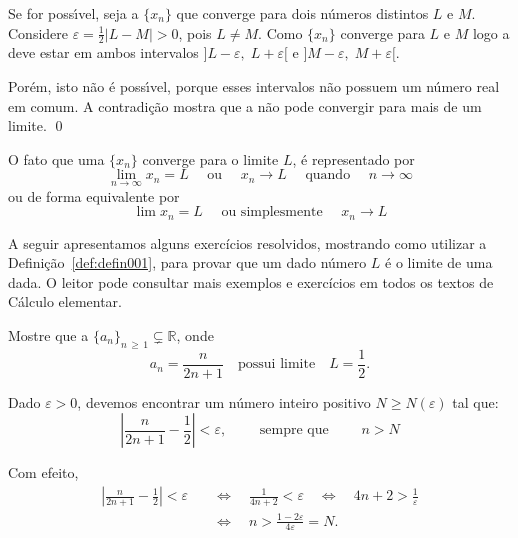 \prova Se for poss\'{\i}vel, seja a \seq $\{x_n\}$ que converge para dois n\'{u}meros distintos $L$ e $M$. Considere $\varepsilon=\frac{1}{2}|L-M|>0$, pois  $L\neq M$. Como $\{x_n\}$ converge para $L$ e $M$ logo a \seq deve estar em ambos intervalos $]L-\varepsilon,\; L+\varepsilon[$ e $]M-\varepsilon,\; M+\varepsilon[$.

Por\'{e}m, isto n\~{a}o \'{e} poss\'{\i}vel, porque esses intervalos n\~{a}o possuem um n\'{u}mero real em comum. A contradi\c{c}\~{a}o mostra que a \seq n\~{a}o pode convergir para mais de um limite. \qed

O fato que uma \seq $\{x_n\}$ converge para o limite $L$, \'{e} representado por
\begin{equation*}
    \lim_{n\to\infty}x_n=L\quad \text{ ou }\quad x_n\to L \quad \text{ quando }\quad n\to \infty
\end{equation*}
ou de forma equivalente por
\begin{equation*}
    \lim x_n=L\quad \text{ ou simplesmente  }\quad x_n\to  L
\end{equation*}


A seguir apresentamos alguns exercícios resolvidos, mostrando como utilizar a 
Defini\c{c}\~{a}o~\ref{def:defin001}, para provar que um dado n\'{u}mero  $L$ \'{e} o limite de 
uma \seq dada. O leitor pode consultar mais exemplos e exercícios em todos os 
textos de C\'{a}lculo elementar.

\begin{exer}
Mostre que a \seq  $\{a_{n}\}_{n\, \geq \, 1} \subsetneq \mathbb{R}$, onde
\begin{equation*}
a_{n}=\frac{n}{2n+1}\quad \text{possui  limite} \quad L=\dfrac{1}{2}.
\end{equation*}
\end{exer}

\solo Dado $\varepsilon>0$, devemos encontrar um n\'{u}mero inteiro positivo $N\geq N(\varepsilon)$ tal
que:
\begin{equation*}
  \left|\frac{n}{2n+1}-\frac{1}{2}\right|<\varepsilon,\qquad \text{ sempre que }\qquad  n>N
\end{equation*}

Com efeito,
\begin{align*}
\left|\frac{n}{2n+1}-\frac{1}{2}\right|<\varepsilon & \quad  \Leftrightarrow \quad  \frac{1}{4n+2}
<\varepsilon \quad \Leftrightarrow \quad  4n+2>\frac{1}{\varepsilon}  \\[2ex]
   & \quad \Leftrightarrow\quad  n>\frac{1-2\varepsilon}{4\varepsilon}=N.
\end{align*}

